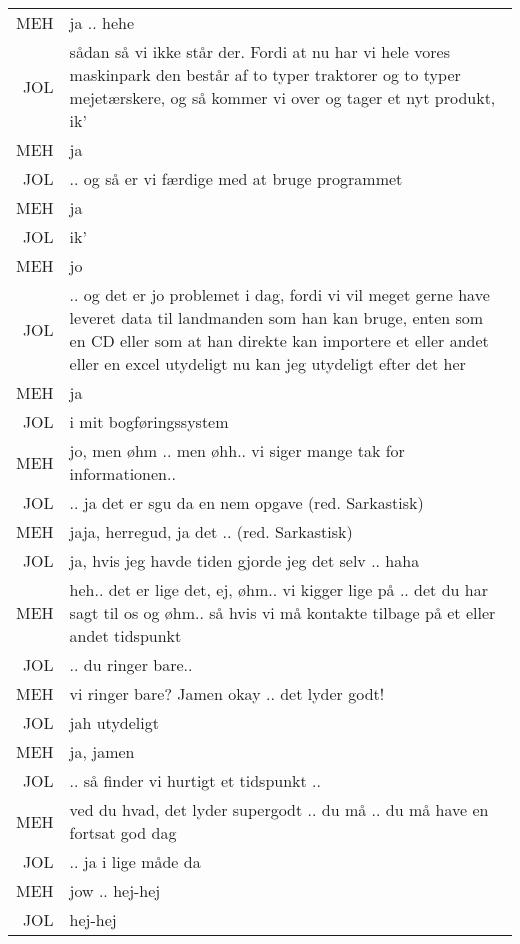 \begin{longtable}{ r | p{13.5cm} }
    MEH & ja .. hehe \\
    JOL & sådan så vi ikke står der. Fordi at nu har vi hele vores maskinpark den består af to typer traktorer og to typer mejetærskere, og så kommer vi over og tager et nyt produkt, ik’ \\ 
    MEH & ja \\
    JOL & .. og så er vi færdige med at bruge programmet \\
    MEH & ja \\
    JOL & ik’ \\
    MEH & jo \\
    JOL & .. og det er jo problemet i dag, fordi vi vil meget gerne have leveret data til landmanden som han kan bruge, enten som en CD eller som at han direkte kan importere et eller andet eller en excel {utydeligt} nu kan jeg {utydeligt} efter det her \\
    MEH & ja \\
    JOL & i mit bogføringssystem \\
    MEH & jo, men øhm .. men øhh.. vi siger mange tak for informationen.. \\
    JOL & .. ja det er sgu da en nem opgave (red. Sarkastisk) \\
    MEH & jaja, herregud, ja det .. (red. Sarkastisk) \\
    JOL & ja, hvis jeg havde tiden gjorde jeg det selv .. haha  \\
    MEH & heh.. det er lige det, ej, øhm.. vi kigger lige på .. det du har sagt til os og øhm.. så hvis vi må kontakte tilbage på et eller andet tidspunkt \\
    JOL & .. du ringer bare.. \\
    MEH & vi ringer bare? Jamen okay .. det lyder godt! \\
    JOL & jah {utydeligt} \\
    MEH & ja, jamen \\
    JOL & .. så finder vi hurtigt et tidspunkt ..\\
    MEH & ved du hvad, det lyder supergodt .. du må .. du må have en fortsat god dag \\
    JOL & .. ja i lige måde da \\
    MEH & jow .. hej-hej \\
    JOL & hej-hej \\
\end{longtable}
